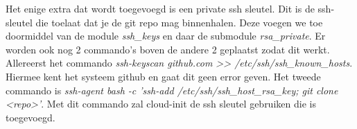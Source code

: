 Het enige extra dat wordt toegevoegd is een private ssh sleutel. Dit is de ssh-sleutel die toelaat dat je de git repo mag binnenhalen. Deze voegen we toe doormiddel van de module \textit{ssh\_keys} en daar de submodule \textit{rsa\_private}. Er worden ook nog 2 commando's boven de andere 2 geplaatst zodat dit werkt. Allereerst het commando \textit{ssh-keyscan github.com >> /etc/ssh/ssh\_known\_hosts}. Hiermee kent het systeem github en gaat dit geen error geven. Het tweede commando is \textit{ssh-agent bash -c 'ssh-add /etc/ssh/ssh\_host\_rsa\_key; git clone <repo>'}. Met dit commando zal cloud-init de ssh sleutel gebruiken die is toegevoegd.
